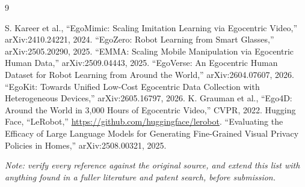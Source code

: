 \documentclass[10pt,twocolumn,letterpaper]{article}
\begin{document}
\begin{thebibliography}{9}

 S. Kareer et al., ``EgoMimic: Scaling Imitation Learning via Egocentric Video,'' arXiv:2410.24221, 2024.
 ``EgoZero: Robot Learning from Smart Glasses,'' arXiv:2505.20290, 2025.
 ``EMMA: Scaling Mobile Manipulation via Egocentric Human Data,'' arXiv:2509.04443, 2025.
 ``EgoVerse: An Egocentric Human Dataset for Robot Learning from Around the World,'' arXiv:2604.07607, 2026.
 ``EgoKit: Towards Unified Low-Cost Egocentric Data Collection with Heterogeneous Devices,'' arXiv:2605.16797, 2026.
 K. Grauman et al., ``Ego4D: Around the World in 3,000 Hours of Egocentric Video,'' CVPR, 2022.
 Hugging Face, ``LeRobot,'' \url{https://github.com/huggingface/lerobot}.
 ``Evaluating the Efficacy of Large Language Models for Generating Fine-Grained Visual Privacy Policies in Homes,'' arXiv:2508.00321, 2025.

\end{thebibliography}

\textit{Note: verify every reference against the original source, and extend this list with anything found in a fuller literature and patent search, before submission.}
\end{document}
